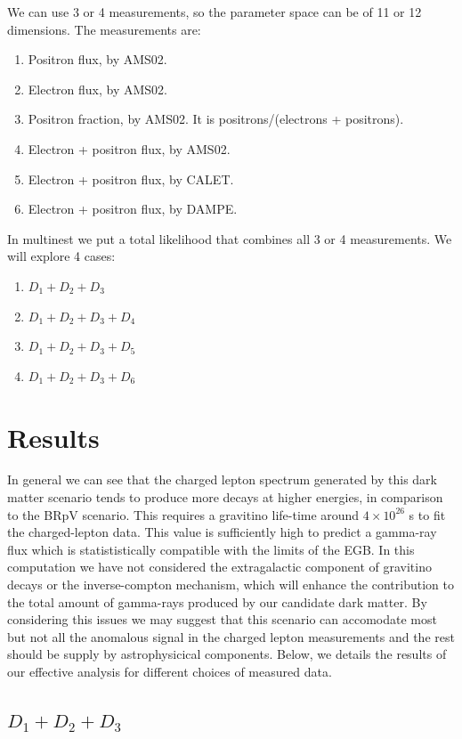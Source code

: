 \documentclass[a4paper,11pt]{article}
\newcommand{\subscript}[2]{$#1 _ #2$}
\begin{document}
We can use 3 or 4 measurements,  so the parameter space can be of 11 or 12 dimensions. The measurements are:
\begin{enumerate}[label=(\subscript{D}{{\arabic*}})]
\item Positron flux, by AMS02.
\item Electron flux, by AMS02.
\item Positron fraction, by AMS02. It is positrons/(electrons + positrons).
\item Electron + positron flux, by AMS02.
\item Electron + positron flux, by CALET.
\item Electron + positron flux, by DAMPE.
\end{enumerate}

In multinest we put a total likelihood that combines all 3 or 4 measurements. We will explore 4 cases:
\begin{enumerate}
\item $D_1 + D_2 + D_3$
\item $D_1 + D_2 + D_3 + D_4$
\item $D_1 + D_2 + D_3 + D_5$
\item $D_1 + D_2 + D_3 + D_6$
\end{enumerate}

\section{Results}

In general we can see that the charged lepton spectrum generated by this dark matter scenario tends to produce more decays at higher energies, in comparison to the BRpV scenario. This requires a gravitino
life-time around $4\times 10^{26}$ s to fit the charged-lepton data. This value is sufficiently high to 
predict a gamma-ray flux which is statististically compatible with the limits of the EGB. In this
computation we have not considered the extragalactic component of gravitino decays or
the inverse-compton mechanism, which will enhance the contribution to the total amount of gamma-rays produced
by our candidate dark matter. By considering this issues we may suggest that this scenario can accomodate
most but not all the anomalous signal in the charged lepton measurements and the rest should be supply by astrophysicical components. Below, we details the results of our effective analysis for different choices
of measured data.  

\subsection{$D_1 + D_2 + D_3$}
\end{document}
